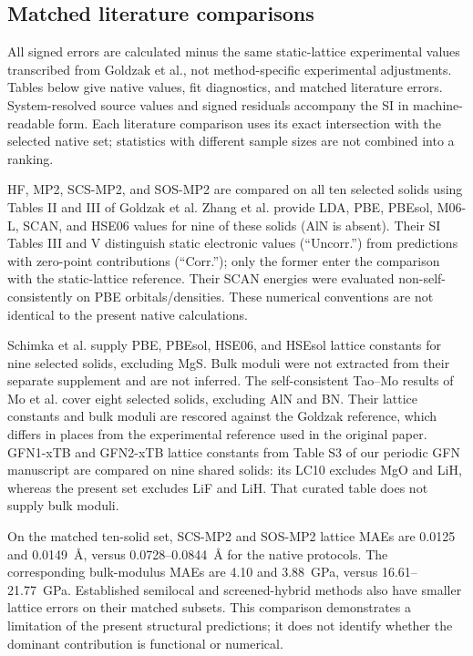 \subsection{Matched literature comparisons}

All signed errors are calculated minus the same static-lattice experimental values transcribed from Goldzak et al.,\cite{Goldzak2022Solids} not method-specific experimental adjustments. Tables below give native values, fit diagnostics, and matched literature errors. System-resolved source values and signed residuals accompany the SI in machine-readable form. Each literature comparison uses its exact intersection with the selected native set; statistics with different sample sizes are not combined into a ranking.

HF, MP2, SCS-MP2, and SOS-MP2 are compared on all ten selected solids using Tables II and III of Goldzak et al. Zhang et al. provide LDA, PBE, PBEsol, M06-L, SCAN, and HSE06 values for nine of these solids (AlN is absent).\cite{Zhang2018Solids} Their SI Tables III and V distinguish static electronic values (``Uncorr.'') from predictions with zero-point contributions (``Corr.''); only the former enter the comparison with the static-lattice reference. Their SCAN energies were evaluated non-self-consistently on PBE orbitals/densities. These numerical conventions are not identical to the present native calculations.

Schimka et al. supply PBE, PBEsol, HSE06, and HSEsol lattice constants for nine selected solids, excluding MgS.\cite{Schimka2011HSEsol} Bulk moduli were not extracted from their separate supplement and are not inferred. The self-consistent Tao--Mo results of Mo et al. cover eight selected solids, excluding AlN and BN.\cite{Mo2017Solids} Their lattice constants and bulk moduli are rescored against the Goldzak reference, which differs in places from the experimental reference used in the original paper. GFN1-xTB and GFN2-xTB lattice constants from Table S3 of our periodic GFN manuscript\cite{Alizadeh2026PeriodicGFN2} are compared on nine shared solids: its LC10 excludes MgO and LiH, whereas the present set excludes LiF and LiH. That curated table does not supply bulk moduli.

On the matched ten-solid set, SCS-MP2 and SOS-MP2 lattice MAEs are 0.0125 and 0.0149~\AA{}, versus 0.0728--0.0844~\AA{} for the native protocols. The corresponding bulk-modulus MAEs are 4.10 and 3.88~GPa, versus 16.61--21.77~GPa. Established semilocal and screened-hybrid methods also have smaller lattice errors on their matched subsets. This comparison demonstrates a limitation of the present structural predictions; it does not identify whether the dominant contribution is functional or numerical.

